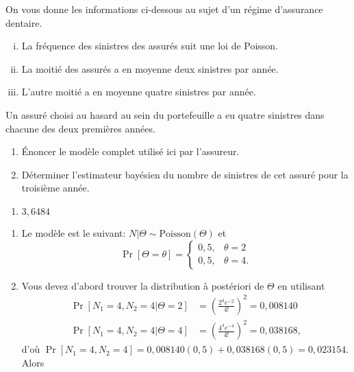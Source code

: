 \begin{exercice}
  On vous donne les informations ci-dessous au sujet d'un régime
  d'assurance dentaire.
  \begin{enumerate}[i)]
  \item La fréquence des sinistres des assurés suit une loi de
    Poisson.
  \item La moitié des assurés a en moyenne deux sinistres par année.
  \item L'autre moitié a en moyenne quatre sinistres par année.
  \end{enumerate}
  Un assuré choisi au hasard au sein du portefeuille a eu quatre
  sinistres dans chacune des deux premières années.
  \begin{enumerate}
  \item Énoncer le modèle complet utilisé ici par l'assureur.
  \item Déterminer l'estimateur bayésien du nombre de sinistres de cet
    assuré pour la troisième année.
  \end{enumerate}
  \begin{rep}
    \begin{enumerate}
    \item $3,6484$
    \end{enumerate}
  \end{rep}
  \begin{sol}
    \begin{enumerate}
    \item Le modèle est le suivant: $N|\Theta \sim
      \text{Poisson}(\Theta)$ et
      \begin{equation*}
        \Pr[\Theta = \theta] =
        \begin{cases}
          0,5, & \theta = 2 \\
          0,5, & \theta = 4.
        \end{cases}
      \end{equation*}
    \item Vous devez d'abord trouver la distribution à postériori de
      $\Theta$ en utilisant
      \begin{align*}
        \Pr[N_1=4, N_2=4|\Theta = 2]
        &= \left( \frac{2^4 e^{-2}}{4!} \right)^2 = 0,008140 \\
        \Pr[N_1=4, N_2=4|\Theta = 4] &= \left( \frac{4^4
            e^{-4}}{4!} \right)^2 = 0,038168,
      \end{align*}
      d'où $\Pr[N_1=4, N_2=4] = 0,008140 (0,5) + 0,038168 (0,5) =
      0,023154$. Alors

\end{enumerate}
\end{sol}
\end{exercice}
